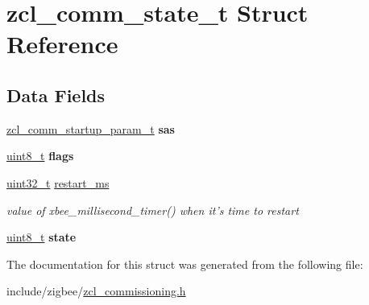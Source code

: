 \hypertarget{structzcl__comm__state__t}{\section{zcl\-\_\-comm\-\_\-state\-\_\-t Struct Reference}
\label{structzcl__comm__state__t}
}
\subsection*{Data Fields}
\begin{DoxyCompactItemize}
\item 
\hypertarget{group__zcl__commissioning_ga218e005b84569abf7ed70ba893311257}{\hyperlink{structzcl__comm__startup__param__t}{zcl\-\_\-comm\-\_\-startup\-\_\-param\-\_\-t} {\bfseries sas}}\label{group__zcl__commissioning_ga218e005b84569abf7ed70ba893311257}

\item 
\hypertarget{group__zcl__commissioning_gaa2585d779da0ab21273a8d92de9a0ebe}{\hyperlink{group__hal_gae1affc9ca37cfb624959c866a73f83c2}{uint8\-\_\-t} {\bfseries flags}}\label{group__zcl__commissioning_gaa2585d779da0ab21273a8d92de9a0ebe}

\item 
\hypertarget{group__zcl__commissioning_ga54811501883a7b2225b1a3111f86b760}{\hyperlink{group__hal__dos_ga09a1e304d66d35dd47daffee9731edaa}{uint32\-\_\-t} \hyperlink{group__zcl__commissioning_ga54811501883a7b2225b1a3111f86b760}{restart\-\_\-ms}}\label{group__zcl__commissioning_ga54811501883a7b2225b1a3111f86b760}

\begin{DoxyCompactList}\small\item\em value of xbee\-\_\-millisecond\-\_\-timer() when it's time to restart \end{DoxyCompactList}\item 
\hypertarget{group__zcl__commissioning_ga0b57aa10271a66f3dc936bba1d2f3830}{\hyperlink{group__hal_gae1affc9ca37cfb624959c866a73f83c2}{uint8\-\_\-t} {\bfseries state}}\label{group__zcl__commissioning_ga0b57aa10271a66f3dc936bba1d2f3830}

\end{DoxyCompactItemize}


The documentation for this struct was generated from the following file\-:\begin{DoxyCompactItemize}
\item 
include/zigbee/\hyperlink{zcl__commissioning_8h}{zcl\-\_\-commissioning.\-h}\end{DoxyCompactItemize}
